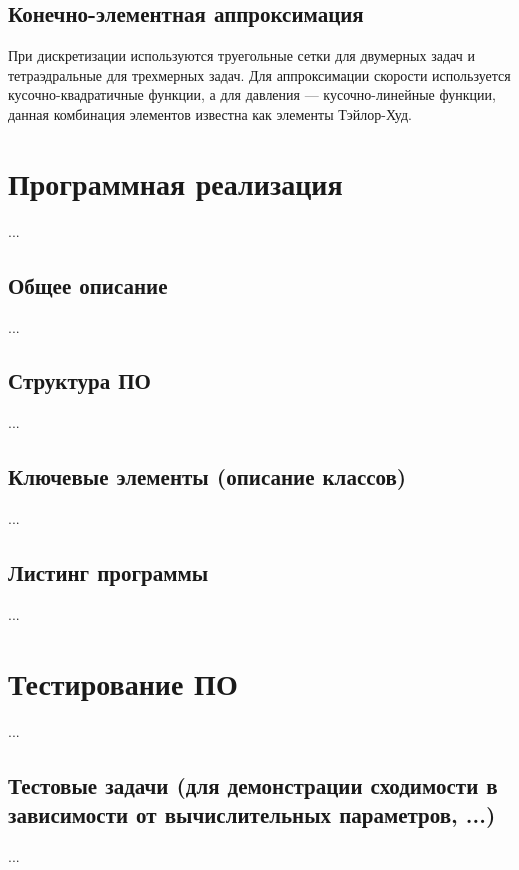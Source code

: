 \documentclass[a4paper,10pt]{report}
\begin{document}
\subsection{Конечно-элементная аппроксимация}

При дискретизации используются труегольные сетки для двумерных задач и тетраэдральные для трехмерных задач.
Для аппроксимации скорости используется кусочно-квадратичные функции, а для давления --- кусочно-линейные функции, данная комбинация элементов известна как элементы Тэйлор-Худ.

\section{Программная реализация}
...

\subsection{Общее описание}
...

\subsection{Структура ПО}
...

\subsection{Ключевые элементы (описание классов)}
...

\subsection{Листинг программы}
...

\section{Тестирование ПО}
...

\subsection{Тестовые задачи (для демонстрации сходимости в зависимости от вычислительных параметров, ...)}
...
\end{document}

